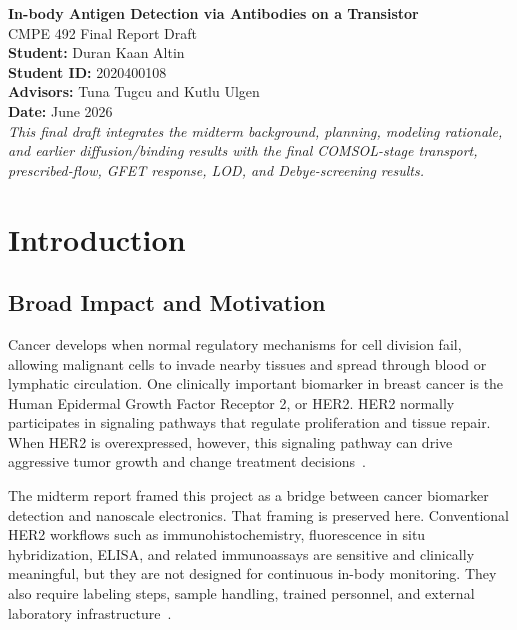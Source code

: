 \documentclass[12pt,a4paper,oneside]{report}
\begin{document}
\begin{titlepage}
\centering
\vspace*{1.8cm}
{\Huge\textbf{In-body Antigen Detection via Antibodies on a Transistor}}\\[0.8cm]
{\Large CMPE 492 Final Report Draft}\\[1.5cm]
\textbf{Student:} Duran Kaan Altin\\
\textbf{Student ID:} 2020400108\\
\textbf{Advisors:} Tuna Tugcu and Kutlu Ulgen\\
\textbf{Date:} June 2026\\[1.5cm]
\vfill
\textit{This final draft integrates the midterm background, planning, modeling rationale, and earlier diffusion/binding results with the final COMSOL-stage transport, prescribed-flow, GFET response, LOD, and Debye-screening results.}
\end{titlepage}

\tableofcontents
\newpage

\chapter{Introduction}

\section{Broad Impact and Motivation}

Cancer develops when normal regulatory mechanisms for cell division fail, allowing malignant cells to invade nearby tissues and spread through blood or lymphatic circulation. One clinically important biomarker in breast cancer is the Human Epidermal Growth Factor Receptor 2, or HER2. HER2 normally participates in signaling pathways that regulate proliferation and tissue repair. When HER2 is overexpressed, however, this signaling pathway can drive aggressive tumor growth and change treatment decisions~\cite{Slamon1987,Wolff2018,yarden2001,kabel2017}.

The midterm report framed this project as a bridge between cancer biomarker detection and nanoscale electronics. That framing is preserved here. Conventional HER2 workflows such as immunohistochemistry, fluorescence in situ hybridization, ELISA, and related immunoassays are sensitive and clinically meaningful, but they are not designed for continuous in-body monitoring. They also require labeling steps, sample handling, trained personnel, and external laboratory infrastructure~\cite{janeway2001,harpaz2017}.
\end{document}

